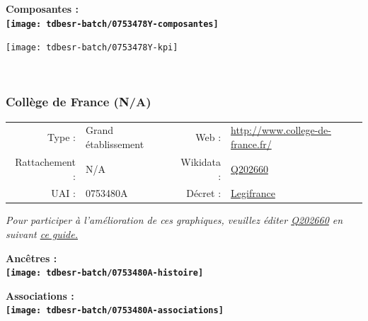 \documentclass[12pt,french,]{article}
\begin{document}
\begin{center} \bf Composantes : \\  
\texttt{[image: tdbesr-batch/0753478Y-composantes]} \end{center}

\begin{center}\texttt{[image: tdbesr-batch/0753478Y-kpi]} \end{center}\checkoddpage

\ifoddpage \fi ~\newpage  

\hypertarget{colluxe8ge-de-france-na}{%
\subsubsection{Collège de France (N/A)}\label{colluxe8ge-de-france-na}}

\begin{tabular*}{\textwidth}{rp{5cm}rl}  
\hline  
Type : & Grand établissement & Web : &\href{http://www.college-de-france.fr/}{http://www.college-de-france.fr/} \\  
Rattachement : & N/A & Wikidata : & \href{https://www.wikidata.org/entity/Q202660}{Q202660} \\  
UAI : & 0753480A & Décret : & \href{http://www.legifrance.gouv.fr/affichTexte.do?dateTexte=&categorieLien=id&cidTexte=JORFTEXT000000350825&fastPos=2&fastReqId=1763095596&oldAction=rechExpTexteJorf}{Legifrance} \\  
\hline  
\end{tabular*}

\textit{\scriptsize Pour participer à l'amélioration de ces graphiques, veuillez éditer  \href{https://www.wikidata.org/entity/Q202660}{Q202660}  en suivant \href{https://github.com/cpesr/wikidataESR/blob/master/Rmd/wikidataESR.md}{ce guide.}}

\vspace{1cm}  
\begin{minipage}[b]{0.50\textwidth}\begin{center} \bf Ancêtres : \\  
\texttt{[image: tdbesr-batch/0753480A-histoire]} \end{center}\end{minipage}\begin{minipage}[b]{0.50\textwidth}\begin{center} \bf Associations : \\  
\texttt{[image: tdbesr-batch/0753480A-associations]} \end{center}\end{minipage}
\end{document}

